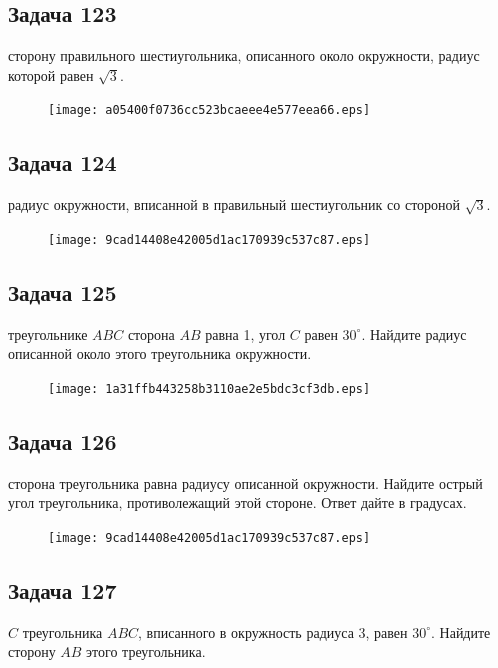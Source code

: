 \documentclass[a4paper,10pt]{article} %
\begin{document}
\begin{spacing}{1.0}
{\subsection*{Задача 123}
 сторону правильного шестиугольника, описанного около окружности, радиус которой равен $\sqrt{3}$.

\vspace{1.5cm}

\begin{figure}{\texttt{[image: a05400f0736cc523bcaeee4e577eea66.eps]}}\end{figure}
\subsection*{Задача 124}
 радиус окружности, вписанной в правильный шестиугольник со стороной $\sqrt{3}$.

\vspace{1.5cm}

\begin{figure}{\texttt{[image: 9cad14408e42005d1ac170939c537c87.eps]}}\end{figure}
\subsection*{Задача 125}
 треугольнике $ABC$ сторона $AB$ равна 1, угол $C$ равен $30^\circ$. Найдите радиус описанной около этого треугольника окружности.

\vspace{2cm}

\begin{figure}{\texttt{[image: 1a31ffb443258b3110ae2e5bdc3cf3db.eps]}}\end{figure}
\subsection*{Задача 126}
 сторона треугольника равна радиусу описанной окружности. Найдите острый угол треугольника, противолежащий этой стороне. Ответ дайте в градусах.


\vspace{1.5cm}

\begin{figure}{\texttt{[image: 9cad14408e42005d1ac170939c537c87.eps]}}\end{figure}
\subsection*{Задача 127}
 $C$ треугольника $ABC$, вписанного в окружность радиуса 3, равен $30^\circ$. Найдите сторону $AB$ этого треугольника.

}
\end{spacing}
\end{document}

